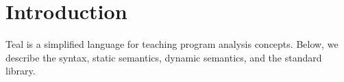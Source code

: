 \section{Introduction}

Teal is a simplified language for teaching program analysis concepts.
Below, we describe the syntax, static semantics, dynamic semantics,
and the standard library.









